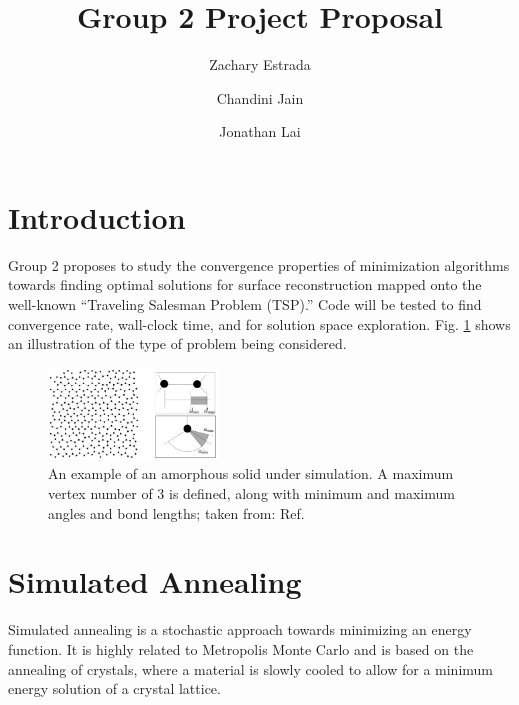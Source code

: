 \documentclass[10pt,twocolumn,notitlepage]{article}
\title{\vspace{-6ex} \textbf{Group 2 Project Proposal}}
\author{Zachary Estrada \and Chandini Jain \and Jonathan Lai}
\begin{document}
\maketitle

\section{Introduction}
Group 2 proposes to study the convergence properties of minimization algorithms towards finding optimal solutions for surface reconstruction mapped onto the well-known ``Traveling Salesman Problem (TSP).''  Code will be tested to find convergence rate, wall-clock time, and for solution space exploration. Fig. \ref{fig:amorphousSilicon} shows an illustration of the type of problem being considered.

\begin{figure}[h!]
	\centering
	\includegraphics[width=0.4\textwidth]{Figures/amorphousSilicon.png}
	\caption{An example of an amorphous solid under simulation.  A maximum vertex number of 3 is defined, along with minimum and maximum angles and bond lengths; taken from: Ref. \protect{}}
	\label{fig:amorphousSilicon}
\end{figure}


\section{Simulated Annealing}
Simulated annealing is a stochastic approach towards minimizing an energy function.  It is highly related to Metropolis Monte Carlo and is based on the annealing of crystals, where a material is slowly cooled to allow for a minimum energy solution of a crystal lattice.  
\end{document}
